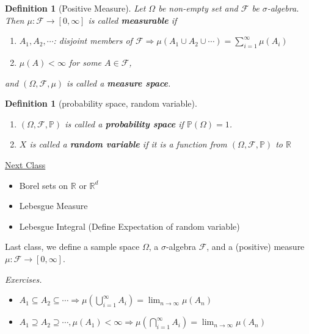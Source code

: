 \documentclass[12pt]{report}
\renewcommand{\1}{\mathbb{1}}
\renewcommand{\subset}{\subseteq}
\renewcommand{\supset}{\supseteq}
\theoremstyle{break}
\theoremstyle{newdef}
\newtheorem{defn}[thm]{Definition} %
\theoremstyle{remark}
\begin{document}
\begin{defn}[Positive Measure]
Let $\Omega$ be non-empty set and $\mathcal{F}$ be $\sigma$-algebra.
Then $\mu: \mathcal{F} \rightarrow [0,\infty]$ is called \textbf{measurable} if
\begin{enumerate}
\item $A_1, A_2, \cdots$: disjoint members of $\mathcal{F} \Rightarrow \mu(A_1\cup A_2\cup \cdots) = \sum_{i=1}^\infty \mu(A_i)$
\item $\mu(A) < \infty$ for some $A \in \mathcal{F}$,
\end{enumerate}
and $(\Omega, \mathcal{F}, \mu)$ is called a \textbf{measure space}.
\end{defn}


\begin{defn}[probability space, random variable]
\leavevmode
\vspace{-6mm}
\begin{enumerate}
\item $(\Omega, \mathcal{F}, \mathbb{P})$ is called a \textbf{probability space} if $\mathbb{P}(\Omega) = 1$.
\item $X$ is called a \textbf{random variable} if it is a function from $(\Omega, \mathcal{F}, \mathbb{P})$ to $\mathbb{R}$
\end{enumerate}
\end{defn}


\underline{Next Class}
\begin{itemize}
\item Borel sets on $\mathbb{R}$ or $\mathbb{R}^d$
\item Lebesgue Measure
\item Lebesgue Integral (Define Expectation of random variable)
\end{itemize}

\vspace{5mm}

Last class, we define a sample space $\Omega$, a $\sigma$-algebra $\mathcal{F}$, and a (positive) measure $\mu : \mathcal{F} \rightarrow [0,\infty]$.
\vspace{5mm}

\textit{Exercises.}
\begin{itemize}
\item $A_1 \subset A_2 \subset \cdots \Rightarrow \mu(\bigcup_{i=1}^\infty A_i) = \lim_{n\rightarrow\infty}\mu(A_n)$
\item $A_1 \supset A_2 \supset \cdots, \mu(A_1) < \infty \Rightarrow \mu(\bigcap_{i=1}^\infty A_i) = \lim_{n\rightarrow\infty}\mu(A_n)$
\end{itemize}
\end{document}
